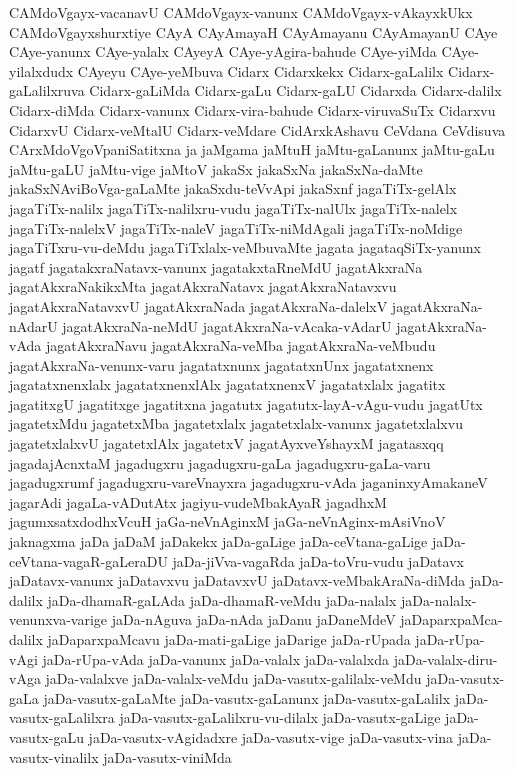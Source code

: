 {CAMdoVgayx-vacanavU
CAMdoVgayx-vanunx
CAMdoVgayx-vAkayxkUkx
CAMdoVgayxshurxtiye
CAyA
CAyAmayaH
CAyAmayanu
CAyAmayanU
CAye
CAye-yanunx
CAye-yalalx
CAyeyA
CAye-yAgira-bahude
CAye-yiMda
CAye-yilalxdudx
CAyeyu
CAye-yeMbuva
Cidarx
Cidarxkekx
Cidarx-gaLalilx
Cidarx-gaLalilxruva
Cidarx-gaLiMda
Cidarx-gaLu
Cidarx-gaLU
Cidarxda
Cidarx-dalilx
Cidarx-diMda
Cidarx-vanunx
Cidarx-vira-bahude
Cidarx-viruvaSuTx
Cidarxvu
CidarxvU
Cidarx-veMtalU
Cidarx-veMdare
CidArxkAshavu
CeVdana
CeVdisuva
CArxMdoVgoVpaniSatitxna
ja
jaMgama
jaMtuH
jaMtu-gaLanunx
jaMtu-gaLu
jaMtu-gaLU
jaMtu-vige
jaMtoV
jakaSx
jakaSxNa
jakaSxNa-daMte
jakaSxNAviBoVga-gaLaMte
jakaSxdu-teVvApi
jakaSxnf
jagaTiTx-gelAlx
jagaTiTx-nalilx
jagaTiTx-nalilxru-vudu
jagaTiTx-nalUlx
jagaTiTx-nalelx
jagaTiTx-nalelxV
jagaTiTx-naleV
jagaTiTx-niMdAgali
jagaTiTx-noMdige
jagaTiTxru-vu-deMdu
jagaTiTxlalx-veMbuvaMte
jagata
jagataqSiTx-yanunx
jagatf
jagatakxraNatavx-vanunx
jagatakxtaRneMdU
jagatAkxraNa
jagatAkxraNakikxMta
jagatAkxraNatavx
jagatAkxraNatavxvu
jagatAkxraNatavxvU
jagatAkxraNada
jagatAkxraNa-dalelxV
jagatAkxraNa-nAdarU
jagatAkxraNa-neMdU
jagatAkxraNa-vAcaka-vAdarU
jagatAkxraNa-vAda
jagatAkxraNavu
jagatAkxraNa-veMba
jagatAkxraNa-veMbudu
jagatAkxraNa-venunx-varu
jagatatxnunx
jagatatxnUnx
jagatatxnenx
jagatatxnenxlalx
jagatatxnenxlAlx
jagatatxnenxV
jagatatxlalx
jagatitx
jagatitxgU
jagatitxge
jagatitxna
jagatutx
jagatutx-layA-vAgu-vudu
jagatUtx
jagatetxMdu
jagatetxMba
jagatetxlalx
jagatetxlalx-vanunx
jagatetxlalxvu
jagatetxlalxvU
jagatetxlAlx
jagatetxV
jagatAyxveYshayxM
jagatasxqq
jagadajAcnxtaM
jagadugxru
jagadugxru-gaLa
jagadugxru-gaLa-varu
jagadugxrumf
jagadugxru-vareVnayxra
jagadugxru-vAda
jaganinxyAmakaneV
jagarAdi
jagaLa-vADutAtx
jagiyu-vudeMbakAyaR
jagadhxM
jagumxsatxdodhxVcuH
jaGa-neVnAginxM
jaGa-neVnAginx-mAsiVnoV
jaknagxma
jaDa
jaDaM
jaDakekx
jaDa-gaLige
jaDa-ceVtana-gaLige
jaDa-ceVtana-vagaR-gaLeraDU
jaDa-jiVva-vagaRda
jaDa-toVru-vudu
jaDatavx
jaDatavx-vanunx
jaDatavxvu
jaDatavxvU
jaDatavx-veMbakAraNa-diMda
jaDa-dalilx
jaDa-dhamaR-gaLAda
jaDa-dhamaR-veMdu
jaDa-nalalx
jaDa-nalalx-venunxva-varige
jaDa-nAguva
jaDa-nAda
jaDanu
jaDaneMdeV
jaDaparxpaMca-dalilx
jaDaparxpaMcavu
jaDa-mati-gaLige
jaDarige
jaDa-rUpada
jaDa-rUpa-vAgi
jaDa-rUpa-vAda
jaDa-vanunx
jaDa-valalx
jaDa-valalxda
jaDa-valalx-diru-vAga
jaDa-valalxve
jaDa-valalx-veMdu
jaDa-vasutx-galilalx-veMdu
jaDa-vasutx-gaLa
jaDa-vasutx-gaLaMte
jaDa-vasutx-gaLanunx
jaDa-vasutx-gaLalilx
jaDa-vasutx-gaLalilxra
jaDa-vasutx-gaLalilxru-vu-dilalx
jaDa-vasutx-gaLige
jaDa-vasutx-gaLu
jaDa-vasutx-vAgidadxre
jaDa-vasutx-vige
jaDa-vasutx-vina
jaDa-vasutx-vinalilx
jaDa-vasutx-viniMda
}
